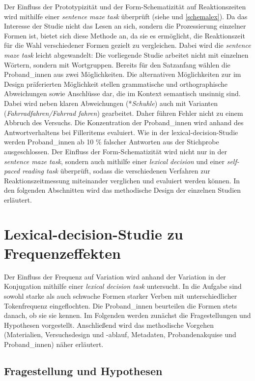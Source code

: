 Der Einfluss der Prototypizität und der Form-Schematizität auf Reaktionszeiten wird mithilfe einer \textit{sentence maze task} überprüft (siehe  und \ref{schemalex}). Da das Interesse der Studie nicht das Lesen an sich, sondern die Prozessierung einzelner Formen ist, bietet sich diese Methode an, da sie es ermöglicht, die Reaktionszeit für die Wahl verschiedener Formen gezielt zu vergleichen. Dabei wird die \textit{sentence maze task} leicht abgewandelt: Die vorliegende Studie arbeitet nicht mit einzelnen Wörtern, sondern mit Wortgruppen. Bereits für den Satzanfang wählen die Proband\_innen aus zwei Möglichkeiten. Die alternativen Möglichkeiten zur im Design präferierten Möglichkeit stellen grammatische und orthographische Abweichungen sowie Anschlüsse dar, die im Kontext semantisch unsinnig sind. Dabei wird neben klaren Abweichungen (*\textit{Schuhle}) auch mit Varianten (\textit{Fahrradfahren/Fahrrad fahren}) gearbeitet. Daher führen Fehler nicht zu einem Abbruch des Versuchs. Die Konzentration der Proband\_innen wird anhand des Antwortverhaltens bei Filleritems evaluiert. Wie in der lexical-decision-Studie werden Proband\_innen ab 10 \% falscher Antworten aus der Stichprobe ausgeschlossen. Der Einfluss der Form-Schematizität wird nicht nur in der \textit{sentence maze task}, sondern auch mithilfe einer \textit{lexical decision} und einer \textit{self-paced reading task} überprüft, sodass die verschiedenen Verfahren zur Reaktionszeitmessung miteinander verglichen und evaluiert werden können. In den folgenden Abschnitten wird das methodische Design der einzelnen Studien erläutert.

\section{Lexical-decision-Studie zu Frequenzeffekten}\label{metfreq}\largerpage

Der Einfluss der Frequenz auf Variation wird anhand der Variation in der Konjugation mithilfe einer \textit{lexical decision task} untersucht. In die Aufgabe sind sowohl starke als auch schwache Formen starker Verben mit unterschiedlicher Tokenfrequenz eingeflochten. Die Proband\_innen beurteilen die Formen stets danach, ob sie sie kennen. Im Folgenden werden zunächst die Fragestellungen und Hypothesen vorgestellt. Anschließend wird das methodische Vorgehen (Materialien, Versuchsdesign und -ablauf, Metadaten, Probandenakquise und Proband\_innen) näher erläutert.

\subsection{Fragestellung und Hypothesen}
\label{freqhyp}

